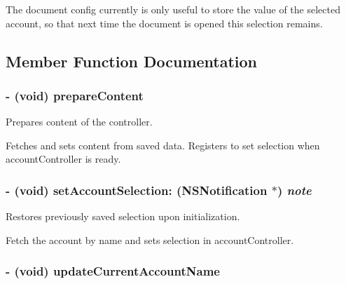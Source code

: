 The document config currently is only useful to store the value of the selected account, so that next time the document is opened this selection remains. 

\subsection{Member Function Documentation}
\hypertarget{interface_z_x_document_config_controller_f60d0ea6edd4aa4301bc2a74c3d42732}{
\subsubsection[{prepareContent}]{\setlength{\rightskip}{0pt plus 5cm}- (void) prepareContent }}
\label{interface_z_x_document_config_controller_f60d0ea6edd4aa4301bc2a74c3d42732}


Prepares content of the controller. 

Fetches and sets content from saved data. Registers to set selection when accountController is ready. \hypertarget{interface_z_x_document_config_controller_f5f7cd78bb2445efb332a61bd6151e8e}{
\subsubsection[{setAccountSelection:}]{\setlength{\rightskip}{0pt plus 5cm}- (void) setAccountSelection: (NSNotification $\ast$) {\em note}}}
\label{interface_z_x_document_config_controller_f5f7cd78bb2445efb332a61bd6151e8e}


Restores previously saved selection upon initialization. 

Fetch the account by name and sets selection in accountController. \hypertarget{interface_z_x_document_config_controller_cfa739fc6f986587297a3e69b04e17ac}{
\subsubsection[{updateCurrentAccountName}]{\setlength{\rightskip}{0pt plus 5cm}- (void) updateCurrentAccountName }}
\label{interface_z_x_document_config_controller_cfa739fc6f986587297a3e69b04e17ac}


